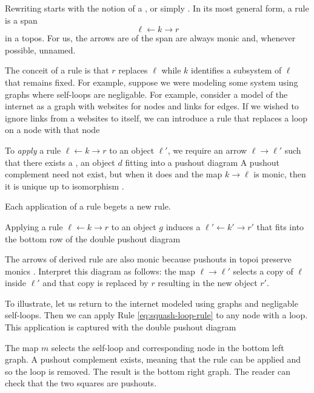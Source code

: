 \documentclass{amsart}
\begin{document}
Rewriting starts with the notion of a , or
simply . In its most general form, a rule is a span
\[
  \ell \gets k \to r
\]
in a topos. For us, the arrows are of the span are always
monic and, whenever possible, unnamed.

The conceit of a rule is that $ r $ replaces $ \ell $ while
$ k $ identifies a subsystem of $ \ell $ that remains
fixed. For example, suppose we were modeling some system
using graphs where self-loops are negligable. For example,
consider a model of the internet as a graph with websites
for nodes and links for edges. If we wished to ignore links
from a websites to itself, we can introduce a rule
that replaces a loop on a node with that node


To \emph{apply} a rule $ \ell \gets k \to r $ to an object
$ \ell' $, we require an arrow $ \ell \to \ell' $ such that
there exists a , an object $ d $
fitting into a pushout diagram  
A pushout complement need not exist, but when it does and
the map $ k \to \ell $ is monic, then it is unique up to
isomorphism \cite[Lem.~15]{LackSobo_Adhesive}.

Each application of a rule begets a new rule.

\begin{definition} \label{def:derived-rule}
  Applying a rule $ \ell \gets k \to r $ to an object $ g $
  induces a  $ \ell' \gets k' \to r' $ that
  fits into the bottom row of the double pushout diagram
  
\end{definition}

The arrows of derived rule are also monic because pushouts
in topoi preserve monics
\cite[Lem.~12]{lack-sobo_adhesive-cats}. Interpret this
diagram as follows: the map $ \ell \to \ell' $ selects a
copy of $ \ell $ inside $ \ell' $ and that copy is replaced
by $ r $ resulting in the new object $ r' $. 

To illustrate, let us return to the internet modeled using
graphs and negligable self-loops.  Then we can
apply Rule \eqref{eq:squash-loop-rule} to any node with a
loop. This application is captured with the double pushout
diagram 

The map $ m $ selects the self-loop and corresponding node
in the bottom left graph. A pushout complement exists,
meaning that the rule can be applied and so the loop is
removed. The result is the bottom right graph.  The reader
can check that the two squares are pushouts.
\end{document}
